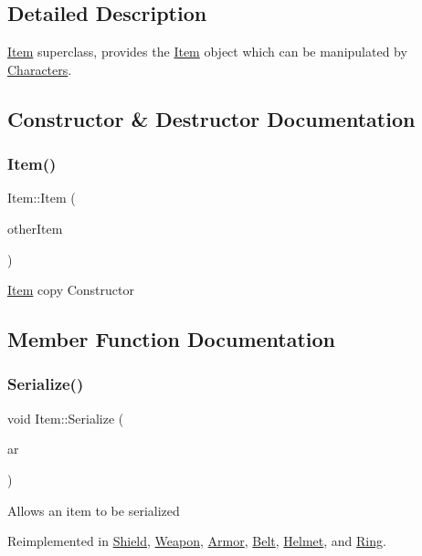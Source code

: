 \subsection{Detailed Description}
\hyperlink{class_item}{Item} superclass, provides the \hyperlink{class_item}{Item} object which can be manipulated by \hyperlink{class_characters}{Characters}. 

\subsection{Constructor \& Destructor Documentation}
\hypertarget{class_item_a2f0671713504024a4b63cd63c835f759}{}\label{class_item_a2f0671713504024a4b63cd63c835f759} 
\subsubsection{\texorpdfstring{Item()}{Item()}}
{\footnotesize\ttfamily Item\+::\+Item (\begin{DoxyParamCaption}\item[{const \hyperlink{class_item}{Item} $\ast$}]{other\+Item }\end{DoxyParamCaption})}

\hyperlink{class_item}{Item} copy Constructor 

\subsection{Member Function Documentation}
\hypertarget{class_item_ad1eae21e57fc3ce3252080a4efbfb8e8}{}\label{class_item_ad1eae21e57fc3ce3252080a4efbfb8e8} 
\subsubsection{\texorpdfstring{Serialize()}{Serialize()}}
{\footnotesize\ttfamily void Item\+::\+Serialize (\begin{DoxyParamCaption}\item[{C\+Archive \&}]{ar }\end{DoxyParamCaption})\hspace{0.3cm}{\ttfamily [virtual]}}

Allows an item to be serialized 

Reimplemented in \hyperlink{class_shield_a8d045c43b16aab5fc474e696cb8a7f1f}{Shield}, \hyperlink{class_weapon_a1c30e8f2add0a1aa8558cfbff13ad728}{Weapon}, \hyperlink{class_armor_a49d9af5d1a2d02e9dbf05d023f4a6515}{Armor}, \hyperlink{class_belt_a39c1f664a2f79f5dedac37546563f493}{Belt}, \hyperlink{class_helmet_abb01d02590723236e9cf9e260824e712}{Helmet}, and \hyperlink{class_ring_a123e40607e2aa46b27da2228af73eb4a}{Ring}.



